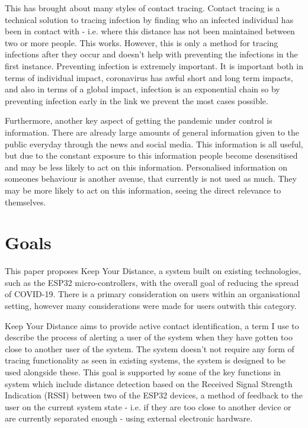 \documentclass{l4proj}
\begin{document}
This has brought about many styles of contact tracing. Contact tracing is a technical solution to tracing infection by finding who an infected individual has been in contact with - i.e. where this distance has not been maintained between two or more people. This works. However, this is only a method for tracing infections after they occur and doesn't help with preventing the infections in the first instance. Preventing infection is extremely important. It is important both in terms of individual impact, coronavirus has awful short and long term impacts, and also in terms of a global impact, infection is an exponential chain so by preventing infection early in the link we prevent the most cases possible.

Furthermore, another key aspect of getting the pandemic under control is information. There are already large amounts of general information given to the public everyday through the news and social media. This information is all useful, but due to the constant exposure to this information people become desensitised \citep{koh_messaging_2020} and may be less likely to act on this information. Personalised information on someones behaviour is another avenue, that currently is not used as much. They may be more likely to act on this information, seeing the direct relevance to themselves.

\section{Goals}

This paper proposes Keep Your Distance, a system built on existing technologies, such as the ESP32 micro-controllers, with the overall goal of reducing the spread of COVID-19. There is a primary consideration on users within an organisational setting, however many considerations were made for users outwith this category.

Keep Your Distance aims to provide active contact identification, a term I use to describe the process of alerting a user of the system when they have gotten too close to another user of the system. The system doesn't not require any form of tracing functionality as seen in existing systems, the system is designed to be used alongside these. This goal is supported by some of the key functions in system which include distance detection based on the Received Signal Strength Indication (RSSI) between two of the ESP32 devices, a method of feedback to the user on the current system state - i.e. if they are too close to another device or are currently separated enough - using external electronic hardware.
\end{document}
